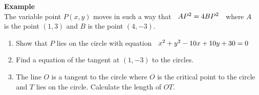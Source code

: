 \documentclass[11pt,a4paper]{article}
\begin{document}
\textbf{Example}\\
The variable point $P(x,y)$ moves in such a way that $\hspace{0.2cm} AP^2 = 4BP^2\hspace{0.2cm}$ where $A$ is the point $(1,3)$ and $B$ is the point $(4,-3)$.
\begin{enumerate}
\item[a.] Show that $P$ lies on the circle with equation $\hspace{0.2cm} x^2 + y^2 - 10x + 10y + 30 = 0$

\item[b.] Find a equation of the tangent at $(1,-3)$ to the circles.

\item[c.] The line $O$ is a tangent to the circle where $O$ is the critical point to the circle and $T$ lies on the circle. Calculate the length of $OT$.\\
\end{enumerate}
\end{document}

